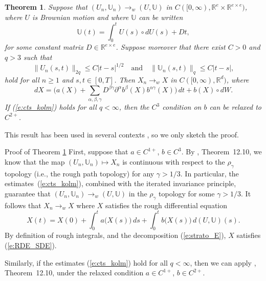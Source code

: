 \documentclass[aop,MSNbibl,seceqn,dvips]{arximspdf}
\newcommand{\eqref}[1]{(\ref{#1})}
\newtheorem{thmm}{Theorem}[section]
\newcommand{\R}{\mathbb{R}}
\newcommand{\BBU}{\mathbb{U}}
\begin{document}
\begin{thmm}\label{thmm:cts_sm}
Suppose that $(U_n,\BBU_n) \to_w (U,\BBU)$ in $C([0,\infty),\R
^e\times\R
^{e\times e})$, where $U$ is Brownian motion and where $\BBU$ can be written
%
\begin{equation}
\label{e:strato_E} \BBU(t) = \int_0^t U(s) \circ
dU(s) + D t,
\end{equation}
%
for some constant matrix $D \in\R^{e\times e}$. Suppose moreover that
there exist $C>0$ and $q>3$ such that
%
\begin{equation}
\label{e:cts_kolm}\bigl \|U_n(s,t) \bigr\|_{2q} \leq
C|t-s|^{1/2} \quad\mbox{and}\quad\bigl \|\BBU _n(s,t) \bigr\|_{q}
\leq C |t-s|,
\end{equation}
%
hold for all $n\ge1$ and $s,t \in[0,T]$. Then $X_n \to_w X$ in
$C([0,\infty),\R^d)$, where
%
\begin{equation}
\label{e:RDE_SDE} dX = \biggl(a(X) + \sum_{\alpha,\beta,\gamma}D^{\beta\gamma}
\partial^\alpha b^{\beta}(X) b^{ \alpha\gamma}(X) \biggr)\,dt +b(X)
\circ dW.
\end{equation}
%
If \eqref{e:cts_kolm} holds for all $q<\infty$, then the $C^3$
condition on $b$ can be relaxed to $C^{2+}$.
\end{thmm}

This result has been used in several contexts \cite
{friz09walk,lejay05}, so we only sketch the proof.

\begin{pf*}{Proof of Theorem \ref{thmm:cts_sm}}
First, suppose that $a\in C^{1+}$, $b\in C^{3}$.
By \cite{friz10}, Theorem~12.10, we know that the map $(U_n,\BBU_n)
\mapsto X_n$ is continuous with respect to the $\rho_\gamma$ topology
(i.e., the rough path topology) for any $\gamma> 1/3$. In particular,
the estimates~\eqref{e:cts_kolm}, combined with the iterated invariance
principle, guarantee that $(U_n,\BBU_n) \to_w (U,\BBU)$ in the $\rho
_\gamma$ topology for some $\gamma> 1/3$. It follows that $X_n \to_w
X$ where $X$ satisfies the rough differential equation
%
\[
X(t) = X(0) + \int_0^t a\bigl(X(s)\bigr)\,ds +
\int_0^t b\bigl(X(s)\bigr)\,d(U,\BBU) (s).
\]
%
By definition of rough integrals, and the decomposition \eqref
{e:strato_E}, $X$ satisfies \eqref{e:RDE_SDE}.

Similarly, if the estimates \eqref{e:cts_kolm} hold for all $q <
\infty
$, then we can apply \cite{friz10}, Theorem~12.10, under the relaxed condition
$a\in C^{1+}$, $b\in C^{2+}$.
\end{pf*}
\end{document}
